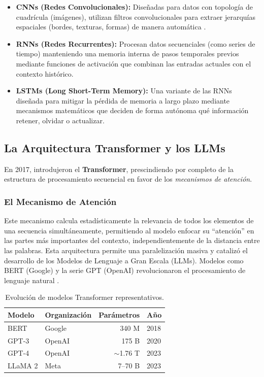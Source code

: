 \documentclass[12pt,a4paper]{article}
\begin{document}
\begin{itemize}
    \item \textbf{CNNs (Redes Convolucionales):} Diseñadas para datos con topología de cuadrícula (imágenes), utilizan filtros convolucionales para extraer jerarquías espaciales (bordes, texturas, formas) de manera automática \citep{lecun2015}.
    \item \textbf{RNNs (Redes Recurrentes):} Procesan datos secuenciales (como series de tiempo) manteniendo una memoria interna de pasos temporales previos mediante funciones de activación que combinan las entradas actuales con el contexto histórico.
    \item \textbf{LSTMs (Long Short-Term Memory):} Una variante de las RNNs diseñada para mitigar la pérdida de memoria a largo plazo mediante mecanismos matemáticos que deciden de forma autónoma qué información retener, olvidar o actualizar.
\end{itemize}

\subsection{La Arquitectura Transformer y los LLMs}

En 2017, \citet{vaswani2017} introdujeron el \textbf{Transformer}, prescindiendo por completo de la estructura de procesamiento secuencial en favor de los \textit{mecanismos de atención}.

\subsubsection{El Mecanismo de Atención}

Este mecanismo calcula estadísticamente la relevancia de todos los elementos de una secuencia simultáneamente, permitiendo al modelo enfocar su ``atención'' en las partes más importantes del contexto, independientemente de la distancia entre las palabras. Esta arquitectura permite una paralelización masiva y catalizó el desarrollo de los Modelos de Lenguaje a Gran Escala (LLMs). Modelos como BERT (Google) y la serie GPT (OpenAI) revolucionaron el procesamiento de lenguaje natural \citep{gill2022}.

\begin{table}[htbp]
    \centering
    \caption{Evolución de modelos Transformer representativos.}
    \label{tab:llms}
    \begin{tabular}{@{}llrl@{}}
        \toprule
        \textbf{Modelo} & \textbf{Organización} & \textbf{Parámetros} & \textbf{Año} \\ \midrule
        BERT & Google & 340 M & 2018 \\
        GPT-3 & OpenAI & 175 B & 2020 \\
        GPT-4 & OpenAI & $\sim$1.76 T & 2023 \\
        LLaMA 2 & Meta & 7--70 B & 2023 \\ \bottomrule
    \end{tabular}
\end{table}
\end{document}
